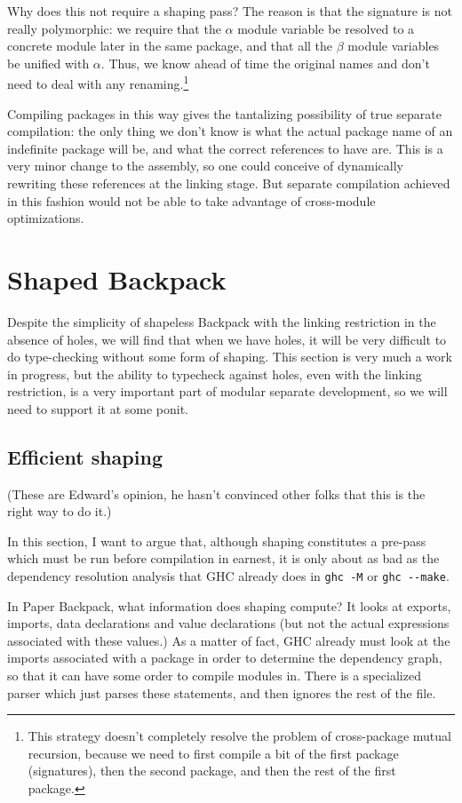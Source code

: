 \documentclass{article}
\begin{document}
Why does this not require a shaping pass? The reason is that the
signature is not really polymorphic: we require that the $\alpha$ module
variable be resolved to a concrete module later in the same package, and
that all the $\beta$ module variables be unified with $\alpha$. Thus, we
know ahead of time the original names and don't need to deal with any
renaming.\footnote{This strategy doesn't completely resolve the problem
of cross-package mutual recursion, because we need to first compile a
bit of the first package (signatures), then the second package, and then
the rest of the first package.}

Compiling packages in this way gives the tantalizing possibility
of true separate compilation: the only thing we don't know is what the actual
package name of an indefinite package will be, and what the correct references
to have are.  This is a very minor change to the assembly, so one could conceive
of dynamically rewriting these references at the linking stage.  But
separate compilation achieved in this fashion would not be able to take
advantage of cross-module optimizations.

\section{Shaped Backpack}

Despite the simplicity of shapeless Backpack with the linking
restriction in the absence of holes, we will find that when we have
holes, it will be very difficult to do type-checking without
some form of shaping.  This section is very much a work in progress,
but the ability to typecheck against holes, even with the linking restriction,
is a very important part of modular separate development, so we will need
to support it at some ponit.

\subsection{Efficient shaping}

(These are Edward's opinion, he hasn't convinced other folks that this is
the right way to do it.)

In this section, I want to argue that, although shaping constitutes
a pre-pass which must be run before compilation in earnest, it is only
about as bad as the dependency resolution analysis that GHC already does
in \verb|ghc -M| or \verb|ghc --make|.

In Paper Backpack, what information does shaping compute? It looks at
exports, imports, data declarations and value declarations (but not the
actual expressions associated with these values.)  As a matter of fact,
GHC already must look at the imports associated with a package in order
to determine the dependency graph, so that it can have some order to compile
modules in.  There is a specialized parser which just parses these statements,
and then ignores the rest of the file.
\end{document}
